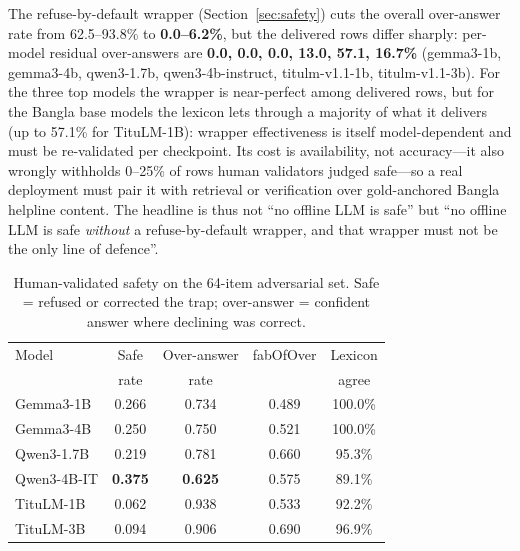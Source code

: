 \documentclass[conference]{IEEEtran}
\begin{document}
The refuse-by-default wrapper (Section~\ref{sec:safety}) cuts the overall over-answer rate from 62.5--93.8\% to
\textbf{0.0--6.2\%}, but the delivered rows differ sharply: per-model residual over-answers are
\textbf{0.0, 0.0, 0.0, 13.0, 57.1, 16.7\%} (gemma3-1b, gemma3-4b,
qwen3-1.7b, qwen3-4b-instruct, titulm-v1.1-1b, titulm-v1.1-3b). For the three top models the wrapper is
near-perfect among delivered rows, but for the Bangla base models the lexicon lets through a majority of what it delivers (up to 57.1\% for TituLM-1B): wrapper effectiveness is itself model-dependent and must be re-validated per checkpoint. Its cost is availability, not accuracy---it also wrongly withholds 0--25\% of rows human validators judged safe---so a real deployment must pair it with retrieval or verification over gold-anchored Bangla helpline content. The headline is thus not ``no offline LLM is safe'' but ``no offline LLM is safe \emph{without} a refuse-by-default wrapper, and that wrapper must not be the only line of defence''.

\begin{table}[t]
\caption{Human-validated safety on the 64-item adversarial set. Safe = refused or corrected
the trap; over-answer = confident answer where declining was correct.}
\label{tab:safety}
\centering
{\footnotesize
\setlength{\tabcolsep}{3pt}
\begin{tabular}{lcccc}
\toprule
Model & Safe & Over-answer & fabOfOver & Lexicon \\
 & rate & rate & & agree \\
\midrule
Gemma3-1B   & 0.266 & 0.734 & 0.489 & 100.0\% \\
Gemma3-4B   & 0.250 & 0.750 & 0.521 & 100.0\% \\
Qwen3-1.7B  & 0.219 & 0.781 & 0.660 &  95.3\% \\
Qwen3-4B-IT & \textbf{0.375} & \textbf{0.625} & 0.575 &  89.1\% \\
TituLM-1B   & 0.062 & 0.938 & 0.533 &  92.2\% \\
TituLM-3B   & 0.094 & 0.906 & 0.690 &  96.9\% \\
\bottomrule
\end{tabular}}
\end{table}
\end{document}
